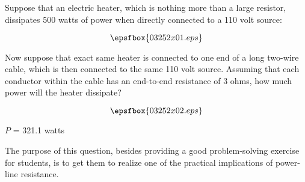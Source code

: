 

Suppose that an electric heater, which is nothing more than a large resistor, dissipates 500 watts of power when directly connected to a 110 volt source:

$$\epsfbox{03252x01.eps}$$

Now suppose that exact same heater is connected to one end of a long two-wire cable, which is then connected to the same 110 volt source.  Assuming that each conductor within the cable has an end-to-end resistance of 3 ohms, how much power will the heater dissipate?

$$\epsfbox{03252x02.eps}$$







$P$ = 321.1 watts







The purpose of this question, besides providing a good problem-solving exercise for students, is to get them to realize one of the practical implications of power-line resistance.




